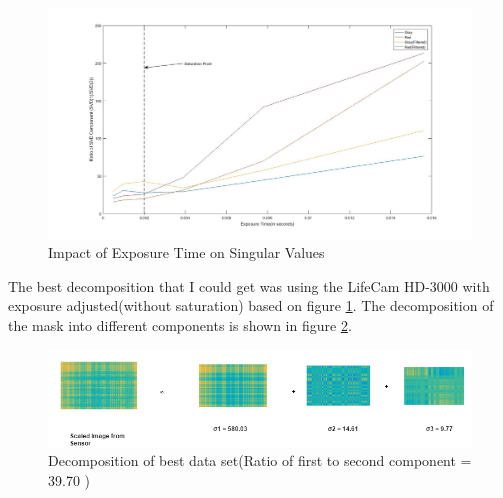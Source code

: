 \begin{figure}[h]
\centering
\includegraphics[width = \linewidth]{pics/slm/svd_graph_exposure.jpg}
\caption{Impact of Exposure Time on Singular Values}
\label{fig:svd_exposure}
\end{figure}
The best decomposition that I could get was using the LifeCam HD-3000 with exposure adjusted(without saturation) based on figure \ref{fig:svd_exposure}. The decomposition of the mask into different components is shown in figure \ref{fig:svd_dec_exp}. 
\begin{figure}[ht]
\centering
\includegraphics[width = \linewidth]{pics/slm/svd-decomp-exp.png}
\caption{Decomposition of best data set(Ratio of first to second component = 39.70 )}
\label{fig:svd_dec_exp}
\end{figure}